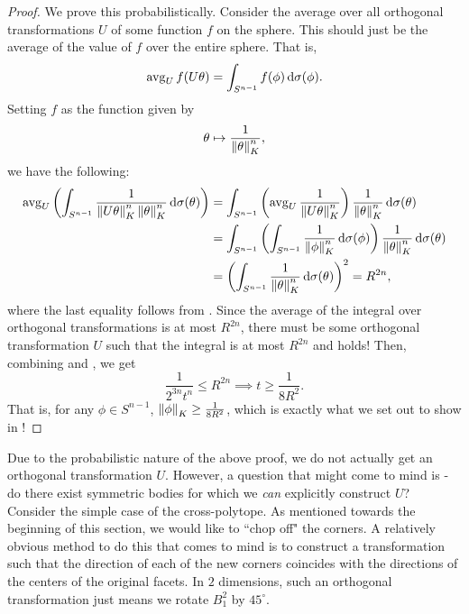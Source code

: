 \begin{proof}
We prove this probabilistically. Consider the average over all orthogonal transformations $U$ of some function $f$ on the sphere. This should just be the average of the value of $f$ over the entire sphere. That is,
\[ \operatorname{avg}_U f(U \theta) = \int_{S^{n-1}} f(\phi) \operatorname{d}\!{\sigma}(\phi). \]
Setting $f$ as the function given by
\[ \theta \mapsto \frac{1}{\left\lVert\theta\right\rVert_K^n}, \]
we have the following:
\begin{align*}
    \operatorname{avg}_U \left(\int_{S^{n-1}} \frac{1}{\left\lVert U\theta\right\rVert^n_K\left\lVert\theta\right\rVert^n_K} \operatorname{d}\!{\sigma}(\theta) \right) &= \int_{S^{n-1}} \left( \operatorname{avg}_U\frac{1}{\left\lVert U\theta\right\rVert^n_K} \right)\frac{1}{\left\lVert\theta\right\rVert^n_K}\operatorname{d}\!{\sigma}(\theta) \\
    &= \int_{S^{n-1}} \left( \int_{S^{n-1}} \frac{1}{\left\lVert\phi\right\rVert^n_K} \operatorname{d}\!{\sigma}(\phi) \right)\frac{1}{\left\lVert\theta\right\rVert^n_K}\operatorname{d}\!{\sigma}(\theta) \\
    &= \left(\int_{S^{n-1}}\frac{1}{\left\lVert\theta\right\rVert^n_K}\operatorname{d}\!{\sigma}(\theta)\right)^2 = R^{2n},
\end{align*}
where the last equality follows from . Since the average of the integral over orthogonal transformations is at most $R^{2n}$, there must be some orthogonal transformation $U$ such that the integral is at most $R^{2n}$ and  holds! Then, combining  and , we get
\[ \frac{1}{2^{3n}t^n} \leq R^{2n} \implies t \geq \frac{1}{8R^2}. \]
That is, for any $\phi\in S^{n-1}$, $\left\lVert\phi\right\rVert_K \geq \frac{1}{8R^2}$, which is exactly what we set out to show in !
\end{proof}

Due to the probabilistic nature of the above proof, we do not actually get an orthogonal transformation $U$. However, a question that might come to mind is - do there exist symmetric bodies for which we \textit{can} explicitly construct $U$?\\
Consider the simple case of the cross-polytope. As mentioned towards the beginning of this section, we would like to ``chop off" the corners. A relatively obvious method to do this that comes to mind is to construct a transformation such that the direction of each of the new corners coincides with the directions of the centers of the original facets. In $2$ dimensions, such an orthogonal transformation just means we rotate $B_1^2$ by $45^\circ$.\\

